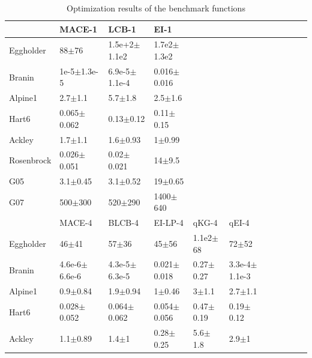 \begin{table}[t]
    \centering
    \caption{Optimization results of the benchmark functions}
    \label{tab:result_analytical}
    \begin{tabular}{lllllllllll}
        \toprule
                    & MACE-1                & LCB-1                 &  EI-1                 &                & \\ \midrule
        Eggholder   & 88$\pm$76             &  1.5e+2$\pm$1.1e2     &  1.7e2$\pm$1.3e2      &                & \\
        Branin      & 1e-5$\pm$1.3e-5       &  6.9e-5$\pm$1.1e-4    &  0.016$\pm$0.016      &                & \\
        Alpine1     & 2.7$\pm$1.1           &  5.7$\pm$1.8          &  2.5$\pm$1.6          &                & \\
        Hart6       & 0.065$\pm$0.062       &  0.13$\pm$0.12        &  0.11$\pm$0.15        &                & \\
        Ackley      & 1.7$\pm$1.1           &  1.6$\pm$0.93         &  1$\pm$0.99           &                & \\
        Rosenbrock  & 0.026$\pm$0.051       &  0.02$\pm$0.021       &  14$\pm$9.5           &                & \\
        G05         & 3.1$\pm$0.45          &  3.1$\pm$0.52         &  19$\pm$0.65          &                & \\
        G07         & 500$\pm$300           &  520$\pm$290          &  1400$\pm$640         &                & \\
        \hline
                    &  MACE-4               & BLCB-4                &  EI-LP-4              & qKG-4          & qEI-4                 \\ \midrule
        Eggholder   &  46$\pm$41            &  57$\pm$36            &  45$\pm$56            &  1.1e2$\pm$68  &  72$\pm$52            \\
        Branin      &  4.6e-6$\pm$6.6e-6    &  4.3e-5$\pm$6.3e-5    &  0.021$\pm$0.018      &  0.27$\pm$0.27 &  3.3e-4$\pm$1.1e-3    \\
        Alpine1     &  0.9$\pm$0.84         &  1.9$\pm$0.94         &  1$\pm$0.46           &  3$\pm$1.1     &  2.7$\pm$1.1          \\
        Hart6       &  0.028$\pm$0.052      &  0.064$\pm$0.062      &  0.054$\pm$0.056      &  0.47$\pm$0.19 &  0.19$\pm$0.12        \\
        Ackley      &  1.1$\pm$0.89         &  1.4$\pm$1            &  0.28$\pm$0.25        &  5.6$\pm$1.8   &  2.9$\pm$1            \\

\end{tabular}
\end{table}

